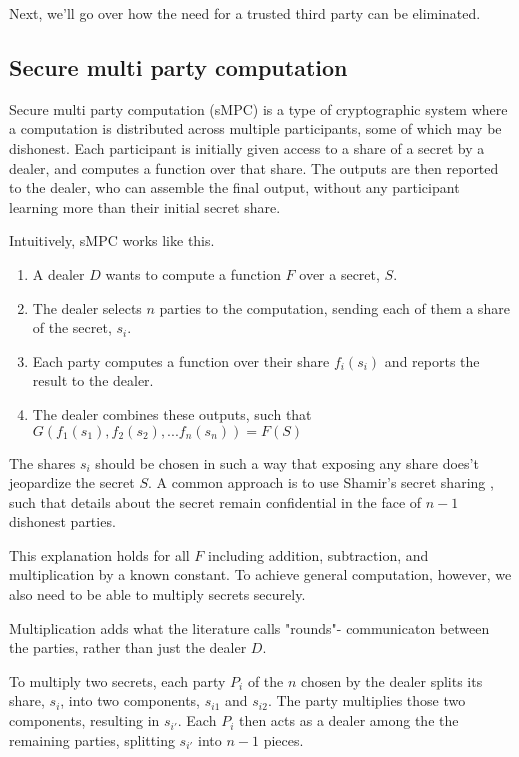 \documentclass[11pt]{article}
\begin{document}
Next, we’ll go over how the need for a trusted third party can be
eliminated.

\subsection{Secure multi party computation}

Secure multi party computation (sMPC) is a type of cryptographic
system where a computation is distributed across multiple
participants, some of which may be dishonest. Each participant is
initially given access to a share of a secret by a dealer, and
computes a function over that share. The outputs are then reported to
the dealer, who can assemble the final output, without any participant
learning more than their initial secret share.

Intuitively, sMPC works like this.

\begin{enumerate}
  \item A dealer $D$ wants to compute a function $F$ over a secret,
      $S$.
  \item The dealer selects $n$ parties to the computation, sending
      each of them a share of the secret, $s_i$.
  \item Each party computes a function over their share $f_i(s_i)$ and
      reports the result to the dealer.
  \item The dealer combines these outputs, such that
      $G(f_1(s_1),f_2(s_2),...f_n(s_n)) = F(S)$
\end{enumerate}

The shares $s_i$ should be chosen in such a way that exposing any
share does't jeopardize the secret $S$. A common approach is to use
Shamir's secret sharing \cite{shamir}, such that details about the
secret remain confidential in the face of $n-1$ dishonest parties.

This explanation holds for all $F$ including addition, subtraction,
and multiplication by a known constant. To achieve general
computation, however, we also need to be able to multiply secrets
securely.

Multiplication adds what the literature calls "rounds"- communicaton
between the parties, rather than just the dealer $D$.

To multiply two secrets, each party $P_i$ of the $n$ chosen by the
dealer splits its share, $s_i$, into two components, $s_{i1}$ and
$s_{i2}$. The party multiplies those two components, resulting in
$s_{i'}$. Each $P_i$ then acts as a dealer among the the remaining
parties, splitting $s_{i'}$ into $n-1$ pieces.
\end{document}

